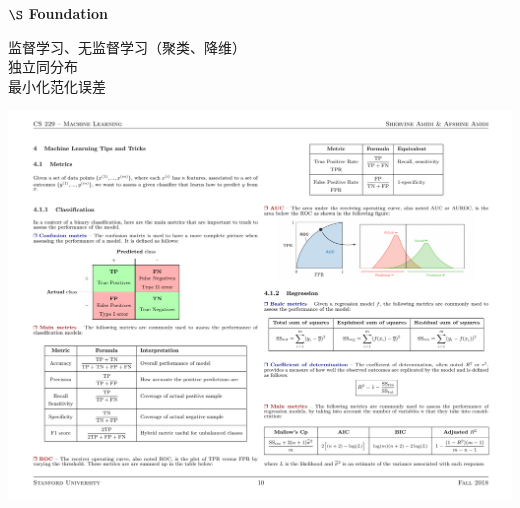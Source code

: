 \documentclass[a4paper,landscape]{article}
\begin{document}
\begin{tiny}
	\renewcommand{\section}[1]{{$\S$ \scriptsize\bfseries #1}}
	\renewcommand{\subsection}[1]{{\scriptsize\bfseries #1}}
	\begin{multicols}{4}
		\section{Foundation}

		\begin{minipage}[]{0.5\linewidth}
			监督学习、无监督学习（聚类、降维）\\独立同分布\\最小化范化误差
		\end{minipage}
		\begin{minipage}[p]{0.48\linewidth}
			\includegraphics[width=\linewidth]{sensitivity.pdf}
		\end{minipage}


\end{multicols}
\end{tiny}
\end{document}
